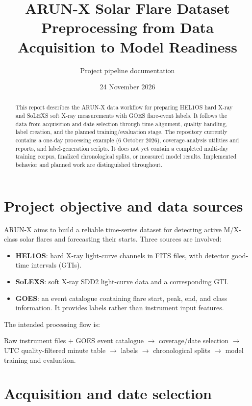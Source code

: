 \documentclass[11pt,a4paper]{article}
\title{\textbf{ARUN-X Solar Flare Dataset}\\[3pt]
\large Preprocessing from Data Acquisition to Model Readiness}
\author{Project pipeline documentation}
\date{24 November 2026}
\begin{document}
\maketitle

\begin{abstract}
This report describes the ARUN-X data workflow for preparing HEL1OS hard X-ray and SoLEXS soft X-ray measurements with GOES flare-event labels. It follows the data from acquisition and date selection through time alignment, quality handling, label creation, and the planned training/evaluation stage. The repository currently contains a one-day processing example (6 October 2026), coverage-analysis utilities and reports, and label-generation scripts. It does not yet contain a completed multi-day training corpus, finalized chronological splits, or measured model results. Implemented behavior and planned work are distinguished throughout.
\end{abstract}

\tableofcontents
\newpage

\section{Project objective and data sources}

ARUN-X aims to build a reliable time-series dataset for detecting active M/X-class solar flares and forecasting their starts. Three sources are involved:
\begin{itemize}
  \item \textbf{HEL1OS}: hard X-ray light-curve channels in FITS files, with detector good-time intervals (GTIs).
  \item \textbf{SoLEXS}: soft X-ray SDD2 light-curve data and a corresponding GTI.
  \item \textbf{GOES}: an event catalogue containing flare start, peak, end, and class information. It provides labels rather than instrument input features.
\end{itemize}

The intended processing flow is:
\begin{center}
Raw instrument files $+$ GOES event catalogue $\longrightarrow$ coverage/date selection $\longrightarrow$ UTC quality-filtered minute table $\longrightarrow$ labels $\longrightarrow$ chronological splits $\longrightarrow$ model training and evaluation.
\end{center}

\section{Acquisition and date selection}
\end{document}
